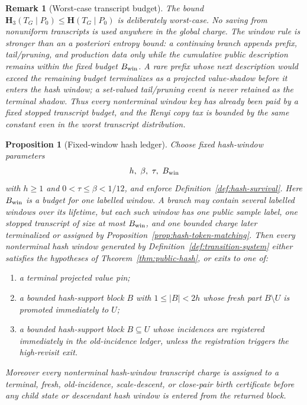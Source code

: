 \documentclass[11pt]{article}
\newtheorem{proposition}[theorem]{Proposition}
\newtheorem{remark}[theorem]{Remark}
\newcommand{\bfH}{\mathbf H}
\begin{document}
\begin{remark}[Worst-case transcript budget]
The bound $\bfH_3(T_G\mid P_0)\le \bfH(T_G\mid P_0)$ is deliberately
worst-case.  No saving from nonuniform transcripts is used anywhere in the
global charge.  The window rule is stronger than an a posteriori entropy
bound: a continuing branch appends prefix, tail/pruning, and production data
only while the cumulative public description remains within the fixed budget
$B_{\rm win}$.  A rare prefix whose next description would exceed the remaining
budget terminalizes as a projected value-shadow before it enters the hash
window; a set-valued tail/pruning event is never retained as the terminal
shadow.
Thus every nonterminal window key has already been paid by a fixed stopped
transcript budget, and the Renyi copy tax is bounded by the same constant even
in the worst transcript distribution.
\end{remark}

\begin{proposition}[Fixed-window hash ledger]
\label{prop:hash-ledger}
Choose fixed hash-window parameters
\[
  h,\ \beta,\ \tau,\ B_{\rm win}
\]
with $h\ge1$ and $0<\tau\le\beta<1/12$, and enforce
Definition~\ref{def:hash-survival}.
Here $B_{\rm win}$ is a budget for one labelled window.  A branch may contain
several labelled windows over its lifetime, but each such window has one public
sample label, one stopped transcript of size at most $B_{\rm win}$, and one
bounded charge later terminalized or assigned by
Proposition~\ref{prop:hash-token-matching}.  Then every nonterminal hash window generated by
Definition~\ref{def:transition-system} either satisfies the hypotheses of
Theorem~\ref{thm:public-hash}, or exits to one of:
\begin{enumerate}[label=\textup{(\roman*)}]
\item a terminal projected value pin;
\item a bounded hash-support block $B$ with $1\le |B|<2h$ whose fresh part
$B\setminus U$ is promoted immediately to $U$;
\item a bounded hash-support block $B\subseteq U$ whose incidences are
registered immediately in the old-incidence ledger, unless the registration
triggers the high-revisit exit.
\end{enumerate}
Moreover every nonterminal hash-window transcript charge is assigned to a
terminal, fresh, old-incidence, scale-descent, or close-pair birth certificate
before any child state or descendant hash window is entered from the returned
block.
\end{proposition}
\end{document}
